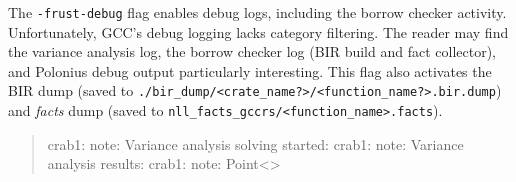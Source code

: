 \documentclass[
  11pt,
  twoside]{report}
\newenvironment{Shaded}{}{}
\newcommand{\NormalTok}[1]{#1}
\begin{document}
The \texttt{-frust-debug} flag enables debug logs, including the borrow
checker activity. Unfortunately, GCC's debug logging lacks category
filtering. The reader may find the variance analysis log, the borrow
checker log (BIR build and fact collector), and Polonius debug output
particularly interesting. This flag also activates the BIR dump (saved
to
\texttt{./bir\_dump/\textless{}crate\_name?\textgreater{}/\textless{}function\_name?\textgreater{}.bir.dump})
and \emph{facts} dump (saved to
\texttt{nll\_facts\_gccrs/\textless{}function\_name\textgreater{}.facts}).

\begin{quote}
\begin{Shaded}
\begin{Highlighting}[]
\NormalTok{crab1: note: Variance analysis solving started:}
\NormalTok{crab1: note: Variance analysis results:}
\NormalTok{crab1: note:  Point\textless{}\textgreater{}}
\end{Highlighting}
\end{Shaded}
\end{quote}
\end{document}
